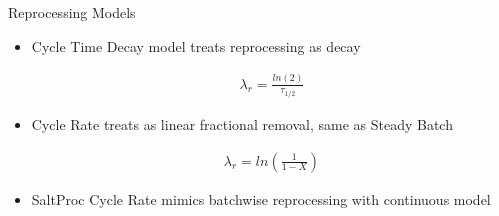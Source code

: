 \documentclass[final]{beamer}
\newlength{\onecolwid}
\newlength{\threecolwid}
\begin{document}
\begin{frame}[t]
\begin{columns}[t,totalwidth=\threecolwid]
\begin{column}{\onecolwid}
\begin{block}{Reprocessing Models}
\begin{itemize}
\begin{align*}	
\frac{dN_j}{dt}_{net} = \frac{dN_j}{dt}_{base} -  \lambda_{r, j} N_j + \sum_{mat} \lambda _{r, i \rightarrow j} N_i
\end{align*}


The symbols given in the equations are defined as follows:
\begin{itemize}
\item $N_j$ is the atomic density of isotope j.
\item $\gamma_{i \rightarrow j}$ is the fractional fission product yield of $j$ in the fission of isotope $i$.
\item $\sigma_{f, i}$ is the microscopic fission cross section of isotope $i$.
\item $\Phi$ is the spectrum-averaged scalar flux in the fuel region.
\item $\lambda _{i \rightarrow j}$ is the decay constant of decay $i \rightarrow j$.
\item $\sigma_{i \rightarrow j}$ is the microscopic transmution cross section of reaction $i \rightarrow j$.
\item $N_i$ is the atomic density of isotope $i$.
\item $\lambda_j$ is the decay constant of isotope $j$.
\item $\lambda_{r, j}$ is the reprocessing constant for removal of isotope $j$.
\item $\sigma_j$ is the microscopic total transmutation cross section of isotope $j$.
\item $\lambda _{r, i \rightarrow j}$ is the reprocessing constant for feed of material $i \rightarrow j$.
\end{itemize}


	\item Cycle Time Decay model treats reprocessing as decay

\begin{align*}
	\lambda_r = \frac{ln(2)}{\tau_{1/2}}
\end{align*}

	\item Cycle Rate treats as linear fractional removal, same as Steady Batch

\begin{align*}
	\lambda_r = ln \left( \frac{1}{1-X} \right)
\end{align*}
	\item SaltProc Cycle Rate mimics batchwise reprocessing with continuous model
\end{itemize}



\end{block}
\end{column}
\end{columns}
\end{frame}
\end{document}
